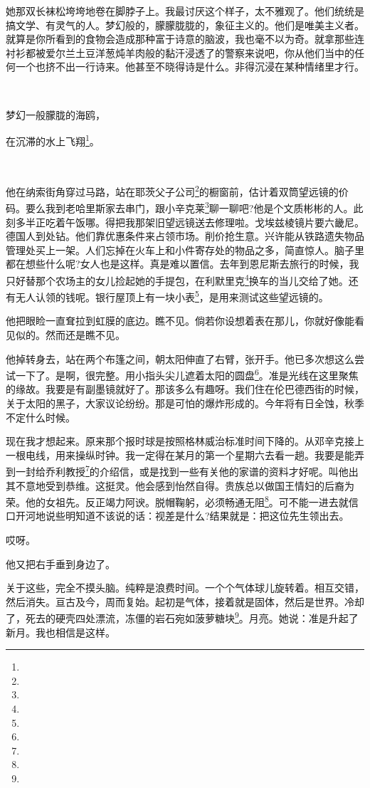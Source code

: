 \par 她那双长袜松垮垮地卷在脚脖子上。我最讨厌这个样子，太不雅观了。他们统统是搞文学、有灵气的人。梦幻般的，朦朦胧胧的，象征主义的。他们是唯美主义者。就算是你所看到的食物会造成那种富于诗意的脑波，我也毫不以为奇。就拿那些连衬衫都被爱尔兰土豆洋葱炖羊肉般的黏汗浸透了的警察来说吧，你从他们当中的任何一个也挤不出一行诗来。他甚至不晓得诗是什么。非得沉浸在某种情绪里才行。
\par  
\par 梦幻一般朦胧的海鸥，
\par 在沉滞的水上飞翔\footnote{}。
\par  
\par 他在纳索街角穿过马路，站在耶茨父子公司\footnote{}的橱窗前，估计着双筒望远镜的价码。要么我到老哈里斯家去串门，跟小辛克莱\footnote{}聊一聊吧?他是个文质彬彬的人。此刻多半正吃着午饭哪。得把我那架旧望远镜送去修理啦。戈埃兹棱镜片要六畿尼。德国人到处钻。他们靠优惠条件来占领市场。削价抢生意。兴许能从铁路遗失物品管理处买上一架。人们忘掉在火车上和小件寄存处的物品之多，简直惊人。脑子里都在想些什么呢?女人也是这样。真是难以置信。去年到恩尼斯去旅行的时候，我只好替那个农场主的女儿捡起她的手提包，在利默里克\footnote{}换车的当儿交给了她。还有无人认领的钱呢。银行屋顶上有一块小表\footnote{}，是用来测试这些望远镜的。
\par 他把眼睑一直耷拉到虹膜的底边。瞧不见。倘若你设想着表在那儿，你就好像能看见似的。然而还是瞧不见。
\par 他掉转身去，站在两个布篷之间，朝太阳伸直了右臂，张开手。他已多次想这么尝试一下了。是啊，很完整。用小指头尖儿遮着太阳的圆盘\footnote{}。准是光线在这里聚焦的缘故。我要是有副墨镜就好了。那该多么有趣呀。我们住在伦巴德西街的时候，关于太阳的黑子，大家议论纷纷。那是可怕的爆炸形成的。今年将有日全蚀，秋季不定什么时候。
\par 现在我才想起来。原来那个报时球是按照格林威治标准时间下降的。从邓辛克接上一根电线，用来操纵时钟。我一定得在某月的第一个星期六去看一趟。我要是能弄到一封给乔利教授\footnote{}的介绍信，或是找到一些有关他的家谱的资料才好呢。叫他出其不意地受到恭维。这挺灵。他会感到怡然自得。贵族总以做国王情妇的后裔为荣。他的女祖先。反正竭力阿谀。脱帽鞠躬，必须畅通无阻\footnote{}。可不能一进去就信口开河地说些明知道不该说的话：视差是什么?结果就是：把这位先生领出去。
\par 哎呀。
\par 他又把右手垂到身边了。
\par 关于这些，完全不摸头脑。纯粹是浪费时间。一个个气体球儿旋转着。相互交错，然后消失。亘古及今，周而复始。起初是气体，接着就是固体，然后是世界。冷却了，死去的硬壳四处漂流，冻僵的岩石宛如菠萝糖块\footnote{}。月亮。她说：准是升起了新月。我也相信是这样。
